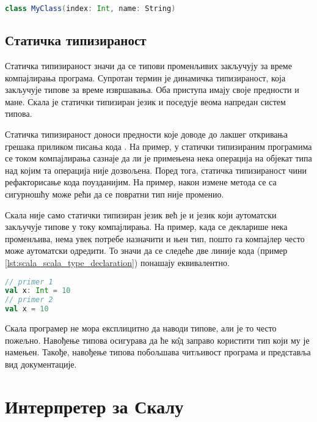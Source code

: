 \documentclass[12pt,oneside]{memoir}
\begin{document}
\begin{lstlisting}[caption={Декларација класе у језику Скала}, language=Scala, label={lst:scala_scala_class_declaration}]
class MyClass(index: Int, name: String)

\end{lstlisting}

\subsection{Статичка типизираност}
\label{subsec:scala_stat_tip}

Статичка типизираност значи да се типови променљивих закључују за време компајлирања програма. Супротан термин је динамичка типизираност, која закључује типове за време извршавања. Оба приступа имају своје предности и мане. Скала је статички типизиран језик и поседује веома напредан систем типова.

Статичка типизираност доноси предности које доводе до лакшег откривања грешака приликом писања кода \cite{scala_prog}. На пример, у статички типизираним програмима се током компајлирања сазнаје да ли је примењена нека операција на објекат типа над којим та операција није дозвољена. Поред тога, статичка типизираност чини рефакторисање кода поузданијим. На пример, након измене метода се са сигурношћу може рећи да се повратни тип није променио.

Скала није само статички типизиран језик већ је и језик који аутоматски закључује типове у току компајлирања. На пример, када се декларише нека променљива, нема увек потребе назначити и њен тип, пошто га компајлер често може аутоматски одредити. То значи да се следеће две линије кода (пример \ref{lst:scala_scala_type_declaration}) понашају еквивалентно.

\begin{lstlisting}[caption={Декларација променљиве са и без експлицитног навођења типа}, language=Scala, label={lst:scala_scala_type_declaration}, basicstyle=\small]
// primer 1
val x: Int = 10
// primer 2
val x = 10
\end{lstlisting}

Скала програмер не мора експлицитно да наводи типове, али је то  често пожељно. Навођење типова осигурава да ће к\^{о}д заправо користити тип који му је намењен. Такође, навођење типова побољшава читљивост програма и представља вид документације.

\section{Интерпретер за Скалу}
\label{sec:scala_interpr}
\end{document}
